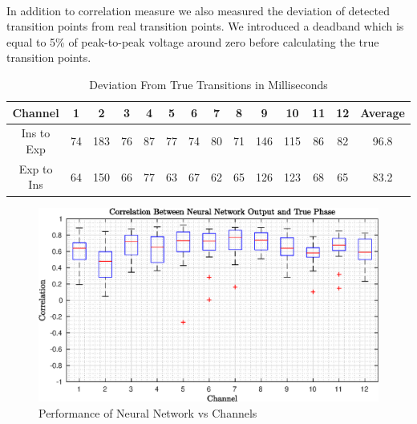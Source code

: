 \paragraph{} In addition to correlation measure we also measured the deviation of detected transition points from real transition points. We introduced a deadband which is equal to 5\% of peak-to-peak voltage around zero before calculating the true transition points.
\begin{table}[h!]
	\centering
	\begin{tabular}{|| c c c c c c c c c c c c c c ||} 
		\hline
		Channel & 1 & 2 & 3 & 4 & 5 & 6 & 7 & 8 & 9 & 10 & 11 & 12 & Average \\ [0.5ex] 
		\hline\hline
		Ins to Exp & 74 & 183 & 76 & 87 & 77 & 74 & 80 & 71 & 146 & 115 & 86 & 82 & 96.8\\ 
		Exp to Ins & 64 & 150 & 66 & 77 & 63 & 67 & 62 & 65 & 126 & 123 & 68 & 65 & 83.2\\
		\hline
	\end{tabular}
	\caption{Deviation From True Transitions in Milliseconds}
	\label{transition_deviation_neural}
\end{table}
\begin{figure}
	\begin{center}
		\includegraphics[width=\textwidth]{figures/neur_net_corr.eps}
		\caption{Performance of Neural Network vs Channels}
		\label{fig:neur_net_corr}
	\end{center}
\end{figure}

